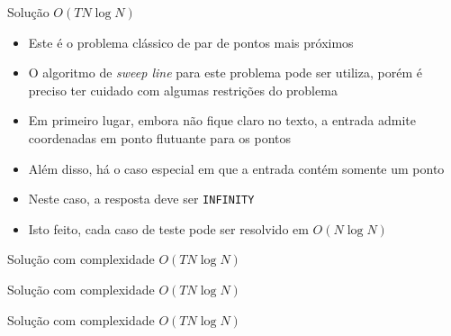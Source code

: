 \begin{frame}[fragile]{Solução $O(TN\log N)$}

    \begin{itemize}
        \item Este é o problema clássico de par de pontos mais próximos
        \pause

        \item O algoritmo de \textit{sweep line} para este problema pode ser utiliza,
            porém é preciso ter cuidado com algumas restrições do problema
        \pause

        \item Em primeiro lugar, embora não fique claro no texto, a entrada admite coordenadas
            em ponto flutuante para os pontos
        \pause

        \item Além disso, há o caso especial em que a entrada contém somente um ponto
        \pause

        \item Neste caso, a resposta deve ser \texttt{INFINITY}
        \pause

        \item Isto feito, cada caso de teste pode ser resolvido em $O(N\log N)$
    \end{itemize}

\end{frame}

\begin{frame}[fragile]{Solução com complexidade $O(TN\log N)$}
\end{frame}

\begin{frame}[fragile]{Solução com complexidade $O(TN\log N)$}
\end{frame}

\begin{frame}[fragile]{Solução com complexidade $O(TN\log N)$}
\end{frame}
